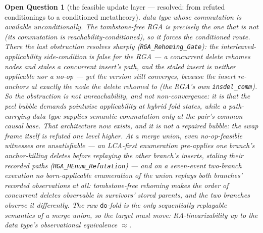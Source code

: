 \documentclass[11pt]{article}
\newtheorem{openq}[theorem]{Open Question}
\newcommand{\lean}[1]{\texttt{#1}}
\begin{document}
\begin{openq}[the feasible update layer --- resolved: from refuted
conditionings to a conditioned metatheory]
data type whose commutation is available unconditionally. The
tombstone-free RGA is precisely the one that is not (its commutation is
reachability-conditioned), so it forces the conditioned route. There the
last obstruction resolves sharply (\lean{RGA\_Rehoming\_Gate}): the
interleaved-applicability side-condition is \emph{false} for the RGA --- a
concurrent delete rehomes nodes and stales a concurrent insert's path, and
the staled insert is neither applicable nor a no-op --- \emph{yet the
version still converges}, because the insert re-anchors at exactly the
node the delete rehomed to (the RGA's own \lean{insdel\_comm}). So the
obstruction is not unreachability, and not non-convergence: it is that the
peel bubble demands \emph{pointwise} applicability at hybrid fold states,
while a path-carrying data type supplies \emph{semantic} commutation only
at the pair's common causal base. That architecture now exists, and it is not a repaired bubble: the swap
frame itself is refuted one level higher. At a merge union, even
\emph{no-op-feasible} witnesses are unsatisfiable --- an LCA-first
enumeration pre-applies one branch's anchor-killing deletes before
replaying the other branch's inserts, staling their recorded paths
(\lean{RGA\_HEnum\_Refutation}) --- and on a seven-event two-branch
execution \emph{no} born-applicable enumeration of the union replays
both branches' recorded observations at all: tombstone-free rehoming
makes the \emph{order of concurrent deletes} observable in survivors'
stored parents, and the two branches observe it differently. The raw
$\mathsf{do}$-fold is the only sequentially replayable semantics of a
merge union, so the \emph{target} must move: RA-linearizability up to
the data type's observational equivalence $\approx$.


\end{openq}
\end{document}
